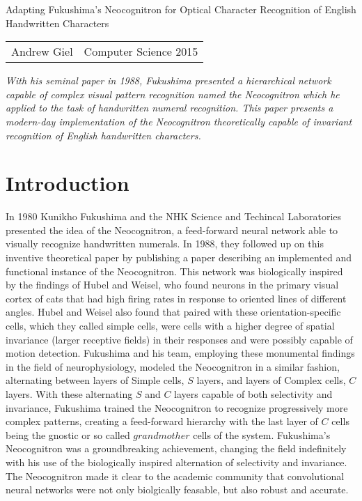 \documentclass[12pt]{article}
\begin{document}
\begin{center}
{\Large Adapting Fukushima's Neocognitron for Optical Character Recognition of English Handwritten Characters}

\begin{tabular}{rl}
Andrew Giel & Computer Science 2015
\end{tabular}
\end{center}

\textit{With his seminal paper in 1988, Fukushima presented a hierarchical network capable of complex visual pattern recognition named the Neocognitron which he applied to the task of handwritten numeral recognition. This paper presents a modern-day implementation of the Neocognitron theoretically capable of invariant recognition of English handwritten characters.}

\section{Introduction}

In 1980 Kunikho Fukushima and the NHK Science and Techincal Laboratories presented the idea of the Neocognitron, a feed-forward neural network able to visually recognize handwritten numerals. In 1988, they followed up on this inventive theoretical paper by publishing a paper describing an implemented and functional instance of the Neocognitron. This network was biologically inspired by the findings of Hubel and Weisel, who found neurons in the primary visual cortex of cats that had high firing rates in response to oriented lines of different angles. Hubel and Weisel also found that paired with these orientation-specific cells, which they called simple cells, were cells with a higher degree of spatial invariance (larger receptive fields) in their responses and were possibly capable of motion detection. Fukushima and his team, employing these monumental findings in the field of neurophysiology, modeled the Neocognitron in a similar fashion, alternating between layers of Simple cells, $S$ layers, and layers of Complex cells, $C$ layers. With these alternating $S$ and $C$ layers capable of both selectivity and invariance, Fukushima trained the Neocognitron to recognize progressively more complex patterns, creating a feed-forward hierarchy with the last layer of $C$ cells being the gnostic or so called $grandmother$ cells of the system. Fukushima's Neocognitron was a groundbreaking achievement, changing the field indefinitely with his use of the biologically inspired alternation of selectivity and invariance. The Neocognitron made it clear to the academic community that convolutional neural networks were not only biolgically feasable, but also robust and accurate. 
\end{document}

